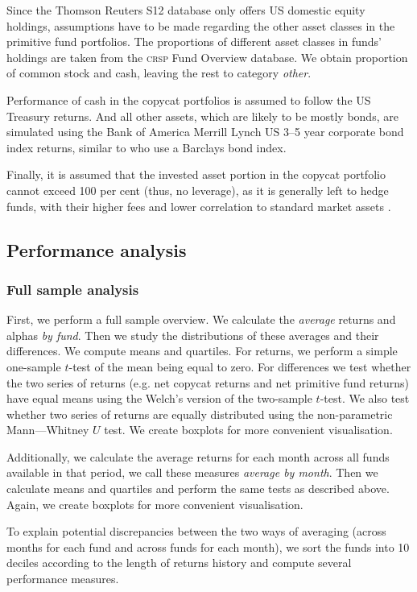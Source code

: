 \documentclass[12pt, a4]{article}
\begin{document}
Since the Thomson Reuters S12 database only offers \textsc{US} domestic equity holdings, assumptions have to be made regarding the other asset classes in the primitive fund portfolios. The proportions of different asset classes in funds' holdings are taken from the \textsc{crsp} Fund Overview database. We obtain proportion of common stock and cash, leaving the rest to category \textit{other}. 

Performance of cash in the copycat portfolios is assumed to follow the \textsc{US} Treasury returns. And all other assets, which are likely to be mostly bonds, are simulated using the Bank of America Merrill Lynch \textsc{US} 3--5 year corporate bond index returns, similar to \cite{verbeek} who use a Barclays bond index. 

Finally, it is assumed that the invested asset portion in the copycat portfolio cannot exceed 100 per cent (thus, no leverage), as it is generally left to hedge funds, with their higher fees and lower correlation to standard market assets \citep{hsieh}.

\subsection{Performance analysis}

\subsubsection{Full sample analysis}
First, we perform a full sample overview. We calculate the \textit{average} returns and alphas \textit{by fund}. Then we study the distributions of these averages and their differences. We compute means and quartiles. For returns, we perform a simple one-sample $t$-test of the mean being equal to zero. For differences we test whether the two series of returns (e.g. net copycat returns and net primitive fund returns) have equal means using the Welch's version of the two-sample $t$-test. We also test whether two series of returns are equally distributed using the non-parametric Mann---Whitney $U$ test. We create boxplots for more convenient visualisation.

Additionally, we calculate the average returns for each month across all funds available in that period, we call these measures  
\textit{average by month}. Then we calculate means and quartiles and perform the same tests as described above. Again, we create boxplots for more convenient visualisation.

To explain potential discrepancies between the two ways of averaging (across months for each fund and across funds for each month), we sort the funds into 10 deciles according to the length of returns history and compute several performance measures.
\end{document}
